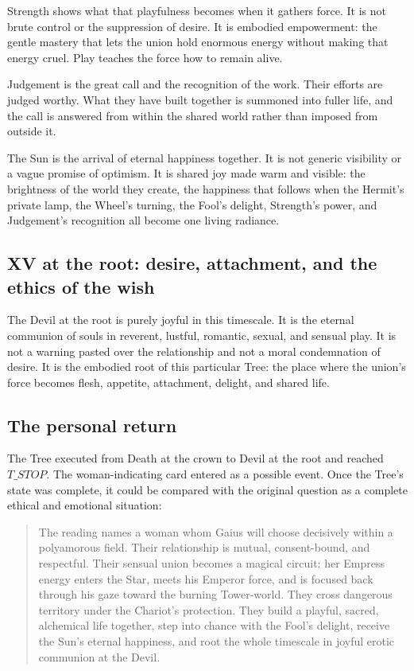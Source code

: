 Strength shows what that playfulness becomes when it gathers force. It is not
brute control or the suppression of desire. It is embodied empowerment: the
gentle mastery that lets the union hold enormous energy without making that
energy cruel. Play teaches the force how to remain alive.

Judgement is the great call and the recognition of the work. Their efforts are
judged worthy. What they have built together is summoned into fuller life, and
the call is answered from within the shared world rather than imposed from
outside it.

The Sun is the arrival of eternal happiness together. It is not generic
visibility or a vague promise of optimism. It is shared joy made warm and
visible: the brightness of the world they create, the happiness that follows
when the Hermit's private lamp, the Wheel's turning, the Fool's delight,
Strength's power, and Judgement's recognition all become one living radiance.

\subsection{XV at the root: desire, attachment, and the ethics of the wish}

The Devil at the root is purely joyful in this timescale. It is the eternal
communion of souls in reverent, lustful, romantic, sexual, and sensual play. It
is not a warning pasted over the relationship and not a moral condemnation of
desire. It is the embodied root of this particular Tree: the place where the
union's force becomes flesh, appetite, attachment, delight, and shared life.

\subsection{The personal return}

The Tree executed from Death at the crown to Devil at the root and reached
$T\_STOP$. The woman-indicating card entered as a possible event. Once the
Tree's state was complete, it could be compared with the original question as a
complete ethical and emotional situation:

\begin{quote}
The reading names a woman whom Gaius will choose decisively within a
polyamorous field. Their relationship is mutual, consent-bound, and respectful.
Their sensual union becomes a magical circuit: her Empress energy enters the
Star, meets his Emperor force, and is focused back through his gaze toward the
burning Tower-world. They cross dangerous territory under the Chariot's
protection. They build a playful, sacred, alchemical life together, step into
chance with the Fool's delight, receive the Sun's eternal happiness, and root
the whole timescale in joyful erotic communion at the Devil.
\end{quote}

